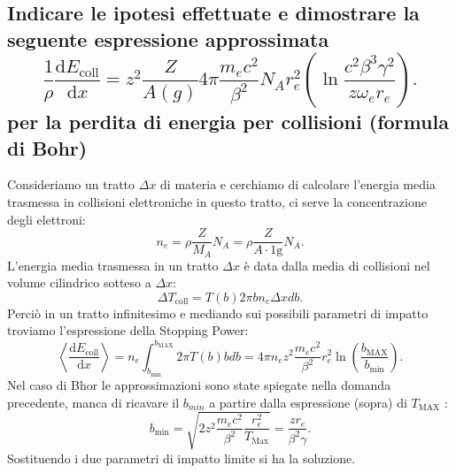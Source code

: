 \subsection[\hspace{1mm} Dimostrare la formula di perdita di energia per collisioni secondo le approssimazioni di Bhor]{Indicare le ipotesi effettuate e dimostrare la seguente espressione approssimata
\[
	\frac{1}{\rho}\frac{\mbox{d} E_{\text{coll}}}{\mbox{d} x} = z^2 \frac{Z}{A\left( g \right) } 4 \pi \frac{m_e c^2}{\beta^2}N_A r_e^2\left( \ln \frac{c^2\beta^3\gamma^2}{z \omega_e r_e} \right) 
.\] 
 per la perdita di energia per collisioni (formula di Bohr)
}
\label{sec:4.b.15}
Consideriamo un tratto $\Delta x$ di materia e cerchiamo di calcolare l'energia media trasmessa in collisioni elettroniche in questo tratto, ci serve la concentrazione degli elettroni:
\[
	n_e =\rho \frac{Z}{M_A}N_A = \rho \frac{Z}{A\cdot 1\text{g}}N_A
.\] 
L'energia media trasmessa in un tratto $\Delta x$ è data dalla media di collisioni nel volume cilindrico sotteso a $\Delta x$:
\[
	\Delta T_{\text{coll}} =T\left( b \right) 2 \pi b n_e \Delta x db
.\] 
Perciò in un tratto infinitesimo e mediando sui possibili parametri di impatto troviamo l'espressione della Stopping Power:
\[
	\left< \frac{\mbox{d} E_{\text{coll}}}{\mbox{d} x} \right> = n_e \int_{b_{\text{min}}}^{b_{\text{MAX}}} 2 \pi T\left( b \right) b db = 
	4 \pi n_e z^2 \frac{m_e c^2}{\beta^2} r_e^2 \ln\left( \frac{b_{\text{MAX}}}{b_{\text{min}}} \right) 
.\] 
Nel caso di Bhor le approssimazioni sono state spiegate nella domanda precedente, manca di ricavare il $b_{min}$ a partire dalla espressione (sopra) di $T_{\text{MAX}}$ :
\[
	b_{\text{min}}= \sqrt{2z^2 \frac{m_e c^2}{\beta^2} \frac{r_e^2}{T_{\text{Max}}} } =
	\frac{zr_e}{\beta^2 \gamma}
.\] 	
Sostituendo i due parametri di impatto limite si ha la soluzione.

